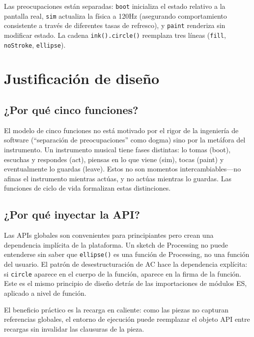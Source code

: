 \documentclass[10pt,letterpaper,twocolumn]{article}
\begin{document}
Las preocupaciones están separadas: \texttt{boot} inicializa el estado relativo a la pantalla real, \texttt{sim} actualiza la física a 120Hz (asegurando comportamiento consistente a través de diferentes tasas de refresco), y \texttt{paint} renderiza sin modificar estado. La cadena \texttt{ink().circle()} reemplaza tres líneas (\texttt{fill}, \texttt{noStroke}, \texttt{ellipse}).


\section{Justificación de diseño}
\label{sec:rationale}

\subsection{¿Por qué cinco funciones?}

El modelo de cinco funciones no está motivado por el rigor de la ingeniería de software (``separación de preocupaciones'' como dogma) sino por la metáfora del instrumento. Un instrumento musical tiene fases distintas: lo tomas (boot), escuchas y respondes (act), piensas en lo que viene (sim), tocas (paint) y eventualmente lo guardas (leave). Estos no son momentos intercambiables---no afinas el instrumento mientras actúas, y no actúas mientras lo guardas. Las funciones de ciclo de vida formalizan estas distinciones.

\subsection{¿Por qué inyectar la API?}

Las APIs globales son convenientes para principiantes pero crean una dependencia implícita de la plataforma. Un sketch de Processing no puede entenderse sin saber que \texttt{ellipse()} es una función de Processing, no una función del usuario. El patrón de desestructuración de AC hace la dependencia explícita: si \texttt{circle} aparece en el cuerpo de la función, aparece en la firma de la función. Este es el mismo principio de diseño detrás de las importaciones de módulos ES, aplicado a nivel de función.

El beneficio práctico es la recarga en caliente: como las piezas no capturan referencias globales, el entorno de ejecución puede reemplazar el objeto API entre recargas sin invalidar las clausuras de la pieza.
\end{document}
